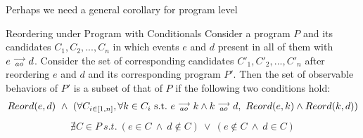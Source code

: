     Perhaps we need a general corollary for program level 
    \begin{corollary}{Reordering under Program with Conditionals}
        Consider a program $P$ and its candidates $C_1, C_2, ... , C_n$ in which events $e$ and $d$ present in all of them with $e\stackrel{\longrightarrow}{_{ao}}d$. Consider the set of corresponding candidates $C'_1, C'_2, ... , C'_n$ after reordering $e$ and $d$ and its corresponding program $P'$. Then the set of observable behaviors of $P'$ is a subset of that of $P$ if the following two conditions hold:
        \begin{align*}
            Reord(e,d) \ \wedge \ 
            ( \forall C_{i \in [1,n]}, \forall k \in C_i \ \text{s.t.} \ \reln{e}{ao}{k} \wedge \reln{k}{ao}{d}, \    
            Reord(e,k) \wedge Reord(k,d) )
        \end{align*}
        \begin{align*}
            \nexists C \in P \ s.t. \ 
                (e \in C \ \wedge \ d \notin C) \ \vee \ 
                (e \notin C \ \wedge \ d \in C) 
        \end{align*}
    \end{corollary}

